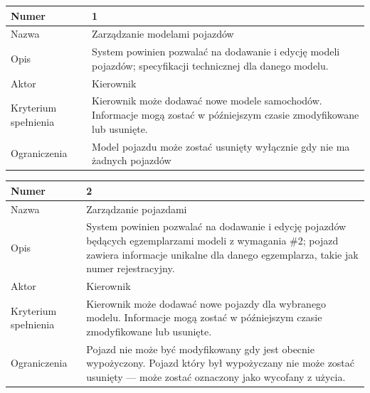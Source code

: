 \documentclass[eng,printmode,openany]{mgr}
\begin{document}
\begin{table}[H]
	\begin{tabularx}{\textwidth}{|l|X|}
		\hline
		Numer                & 1  \\ \hline
		Nazwa                & Zarządzanie modelami pojazdów \\ \hline
		Opis                 & System powinien pozwalać na dodawanie i edycję modeli pojazdów; specyfikacji technicznej dla danego modelu.    \\ \hline
		Aktor                & Kierownik \\ \hline
		Kryterium spełnienia & Kierownik może dodawać nowe modele samochodów. Informacje mogą zostać w późniejszym czasie zmodyfikowane lub usunięte.\\ \hline
		Ograniczenia         & Model pojazdu może zostać usunięty wyłącznie gdy nie ma żadnych pojazdów \\ \hline
	\end{tabularx}
\end{table}

\begin{table}[H]
	\begin{tabularx}{\textwidth}{|l|X|}
		\hline
		Numer                & 2 \\ \hline
		Nazwa                & Zarządzanie pojazdami \\ \hline
		Opis                 & System powinien pozwalać na dodawanie i edycję pojazdów będących egzemplarzami modeli z wymagania \#2; pojazd zawiera informacje unikalne dla danego egzemplarza, takie jak numer rejestracyjny.     \\ \hline
		Aktor                & Kierownik \\ \hline
		Kryterium spełnienia & Kierownik może dodawać nowe pojazdy dla wybranego modelu. Informacje mogą zostać w późniejszym czasie zmodyfikowane lub usunięte.\\ \hline
		Ograniczenia         & Pojazd nie może być modyfikowany gdy jest obecnie wypożyczony. Pojazd który był wypożyczany nie może zostać usunięty — może zostać oznaczony jako wycofany z użycia. \\ \hline
	\end{tabularx}
\end{table}
\end{document}
